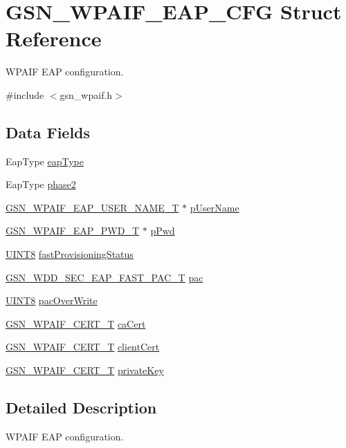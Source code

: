 \hypertarget{a00423}{
\section{GSN\_\-WPAIF\_\-EAP\_\-CFG Struct Reference}
\label{a00423}
}


WPAIF EAP configuration.  




{\ttfamily \#include $<$gsn\_\-wpaif.h$>$}

\subsection*{Data Fields}
\begin{DoxyCompactItemize}
\item 
EapType \hyperlink{a00423_aa0bbdc8165b6fcc84e7529322a4041e8}{eapType}
\item 
EapType \hyperlink{a00423_adc4c063b01286b395255c244dda7138d}{phase2}
\item 
\hyperlink{a00290}{GSN\_\-WPAIF\_\-EAP\_\-USER\_\-NAME\_\-T} $\ast$ \hyperlink{a00423_ab8e7846ab3c3642c81c6cc0e9ac697c6}{pUserName}
\item 
\hyperlink{a00289}{GSN\_\-WPAIF\_\-EAP\_\-PWD\_\-T} $\ast$ \hyperlink{a00423_a0c4c9d6363fa2c13ad01f4bf562b1248}{pPwd}
\item 
\hyperlink{a00660_gab27e9918b538ce9d8ca692479b375b6a}{UINT8} \hyperlink{a00423_a4dc9193a014ae4c6113a2e44bc50c9a6}{fastProvisioningStatus}
\item 
\hyperlink{a00288}{GSN\_\-WDD\_\-SEC\_\-EAP\_\-FAST\_\-PAC\_\-T} \hyperlink{a00423_a33c4dc19eab43caa7d0e1c94cb079af8}{pac}
\item 
\hyperlink{a00660_gab27e9918b538ce9d8ca692479b375b6a}{UINT8} \hyperlink{a00423_ad688cc5df70aa8543118438c08e7c978}{pacOverWrite}
\item 
\hyperlink{a00421}{GSN\_\-WPAIF\_\-CERT\_\-T} \hyperlink{a00423_a85a21c86b1a4e31e3d2ce52be6274ec6}{caCert}
\item 
\hyperlink{a00421}{GSN\_\-WPAIF\_\-CERT\_\-T} \hyperlink{a00423_a063199a2ac038722dd24e9328de2cafa}{clientCert}
\item 
\hyperlink{a00421}{GSN\_\-WPAIF\_\-CERT\_\-T} \hyperlink{a00423_a2204610fc64182c150aa6c0523a8a017}{privateKey}
\end{DoxyCompactItemize}


\subsection{Detailed Description}
WPAIF EAP configuration. 

